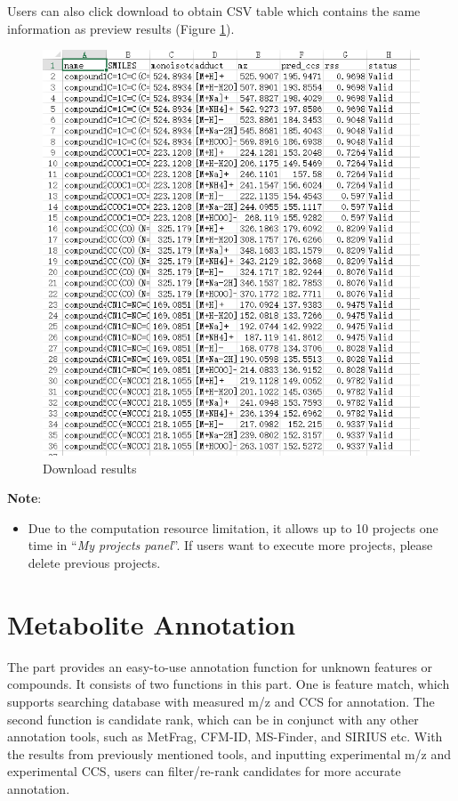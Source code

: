 \documentclass[12pt,]{book}
\providecommand{\tightlist}{%
  \setlength{\itemsep}{0pt}\setlength{\parskip}{0pt}}
\theoremstyle{definition}
\theoremstyle{definition}
\theoremstyle{definition}
\theoremstyle{remark}
\begin{document}
Users can also click download to obtain CSV table which contains the
same information as preview results (Figure \ref{fig:figure3d4}).

\begin{figure}

{\centering \includegraphics{images/chapter3/figure3.4download_result} 

}

\caption{Download results}\label{fig:figure3d4}
\end{figure}

\textbf{Note}:

\begin{itemize}
\tightlist
\item
  Due to the computation resource limitation, it allows up to 10
  projects one time in ``\emph{My projects panel}''. If users want to
  execute more projects, please delete previous projects.
\end{itemize}

\chapter{Metabolite Annotation}\label{chapter4}

The part provides an easy-to-use annotation function for unknown
features or compounds. It consists of two functions in this part. One is
feature match, which supports searching database with measured m/z and
CCS for annotation. The second function is candidate rank, which can be
in conjunct with any other annotation tools, such as MetFrag, CFM-ID,
MS-Finder, and SIRIUS etc. With the results from previously mentioned
tools, and inputting experimental m/z and experimental CCS, users can
filter/re-rank candidates for more accurate annotation.
\end{document}
